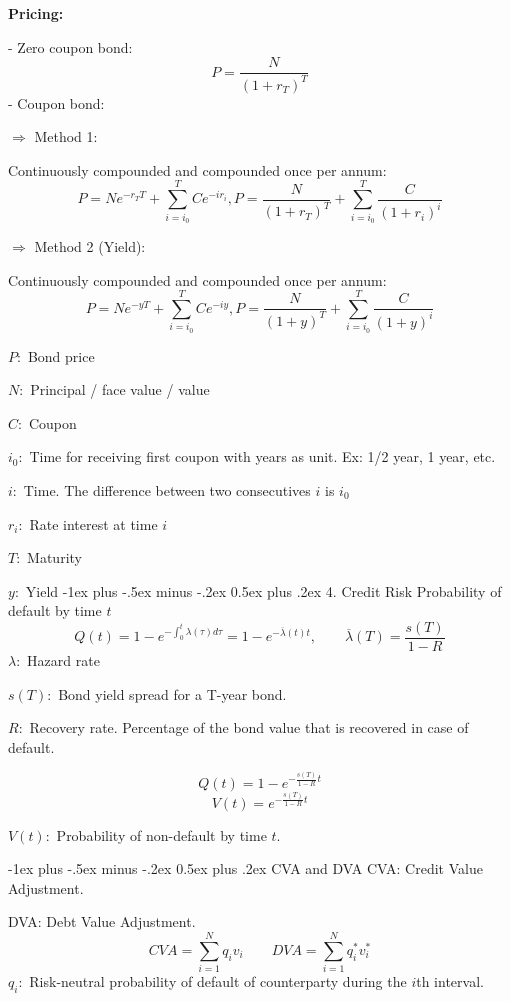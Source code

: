 \documentclass[10pt,landscape]{article}
\makeatletter
\renewcommand{\section}{\@startsection{section}{1}{0mm}%
                                {-1ex plus -.5ex minus -.2ex}%
                                {0.5ex plus .2ex}%
                                {\normalfont\large\bfseries}}
\renewcommand{\subsection}{\@startsection{subsection}{2}{0mm}%
                                {-1ex plus -.5ex minus -.2ex}%
                                {0.5ex plus .2ex}%
                                {\normalfont\normalsize\bfseries}}
\makeatother
\begin{document}
\begin{multicols}{3}
    \textbf{Pricing:}
    
    - Zero coupon bond:
    $$P=\frac{N}{(1+r_T)^T}$$
    - Coupon bond:
    
    
    $\Rightarrow$ Method 1:
    
    Continuously compounded and compounded once per annum:
    $$P=Ne^{-r_TT} + \sum_{i=i_0}^T Ce^{-ir_i}, P=\frac{N}{(1+r_T)^T} + \sum_{i=i_0}^T \frac{C}{(1+r_i)^i}$$

    $\Rightarrow$ Method 2 (Yield):
    
    Continuously compounded and compounded once per annum:
    $$P=Ne^{-yT} + \sum_{i=i_0}^T Ce^{-iy}, P=\frac{N}{(1+y)^T} + \sum_{i=i_0}^T \frac{C}{(1+y)^{i}}$$

    $P:$ Bond price
    
    $N:$ Principal / face value / value

    $C:$ Coupon

    $i_0:$ Time for receiving first coupon with years as unit. Ex: 1/2 year, 1 year, etc. 
    
    $i:$ Time. The difference between two consecutives $i$ is $i_0$
    
    $r_i:$ Rate interest at time $i$

    $T:$ Maturity

    $y:$ Yield
    \section{4. Credit Risk}
    Probability of default by time $t$
    $$Q(t) = 1 - e^{-\int_{0}^{t}\lambda(\tau)d \tau} = 1 - e^{-\overline{\lambda}(t)t}, \qquad \overline{\lambda}(T) = \frac{s(T)}{1-R}$$
    $\lambda:$ Hazard rate

    $s(T):$ Bond yield spread for a T-year bond.
    
    $R:$ Recovery rate. Percentage of the bond value that is recovered in case of default.
    
    $$Q(t) = 1 - e^{-\frac{s(T)}{1-R}t}$$
    $$V(t) = e^{-\frac{s(T)}{1-R}t}$$

    $V(t):$ Probability of non-default by time $t$.

    \subsection{CVA and DVA}
    CVA: Credit Value Adjustment. 
    
    DVA: Debt Value Adjustment.
    $$CVA = \sum_{i=1}^{N}q_i v_i \qquad DVA = \sum_{i=1}^{N}q_i^* v_i^*$$
    $q_i:$ Risk-neutral probability of default of counterparty during the $i$th interval.
    

\end{multicols}
\end{document}
